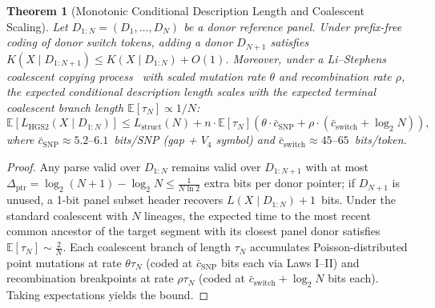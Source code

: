 \documentclass[10pt]{article}
\newtheorem{theorem}{Theorem}
\theoremstyle{definition}
\begin{document}
\begin{theorem}[Monotonic Conditional Description Length and Coalescent Scaling]
\label{thm:law3}
Let $D_{1:N} = (D_1,\dots,D_N)$ be a donor reference panel. Under prefix-free coding of donor switch tokens, adding a donor $D_{N+1}$ satisfies $K(X \mid D_{1:N+1}) \le K(X \mid D_{1:N}) + O(1)$. Moreover, under a Li--Stephens coalescent copying process~\cite{li2003relating} with scaled mutation rate $\theta$ and recombination rate $\rho$, the expected conditional description length scales with the expected terminal coalescent branch length $\mathbb{E}[\tau_N] \propto 1/N$:
\begin{equation}
  \mathbb{E}[L_{\text{HGS2}}(X \mid D_{1:N})] \le L_{\text{struct}}(N) + n \cdot \mathbb{E}[\tau_N] \left(\theta \cdot \bar{c}_{\text{SNP}} + \rho \cdot (\bar{c}_{\text{switch}} + \log_2 N)\right),
\end{equation}
where $\bar{c}_{\text{SNP}} \approx 5.2\text{--}6.1$~bits/SNP (gap + $V_4$ symbol) and $\bar{c}_{\text{switch}} \approx 45\text{--}65$~bits/token.
\end{theorem}
\begin{proof}
Any parse valid over $D_{1:N}$ remains valid over $D_{1:N+1}$ with at most $\Delta_{\text{ptr}} = \log_2(N+1) - \log_2 N \le \frac{1}{N \ln 2}$ extra bits per donor pointer; if $D_{N+1}$ is unused, a 1-bit panel subset header recovers $L(X \mid D_{1:N}) + 1$~bits. Under the standard coalescent with $N$ lineages, the expected time to the most recent common ancestor of the target segment with its closest panel donor satisfies $\mathbb{E}[\tau_N] \sim \frac{2}{N}$. Each coalescent branch of length $\tau_N$ accumulates Poisson-distributed point mutations at rate $\theta \tau_N$ (coded at $\bar{c}_{\text{SNP}}$ bits each via Laws I--II) and recombination breakpoints at rate $\rho \tau_N$ (coded at $\bar{c}_{\text{switch}} + \log_2 N$ bits each). Taking expectations yields the bound.
\end{proof}
\end{document}
